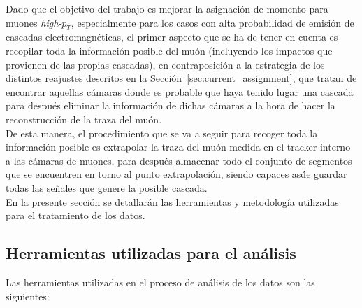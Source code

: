 
Dado que el objetivo del trabajo es mejorar la asignaci\'on de momento para muones \textit{high-$p_{T}$}, especialmente para los casos con alta probabilidad de emisi\'on de cascadas electromagn\'eticas, el primer aspecto que se ha de tener en cuenta es recopilar toda la informaci\'on posible del mu\'on (incluyendo los impactos que provienen de las propias cascadas), en contraposici\'on a la estrategia de los distintos reajustes descritos en la Secci\'on~\ref{sec:current_assignment}, que tratan de encontrar aquellas c\'amaras donde es probable que haya tenido lugar una cascada para despu\'es eliminar la informaci\'on de dichas c\'amaras a la hora de hacer la reconstrucci\'on de la traza del mu\'on. \\
De esta manera, el procedimiento que se va a seguir para recoger toda la informaci\'on posible es extrapolar la traza del mu\'on medida en el tracker interno a las c\'amaras de muones, para despu\'es almacenar todo el conjunto de segmentos que se encuentren en torno al punto extrapolaci\'on, siendo capaces as\' de guardar todas las se\~nales que genere la posible cascada. \\

En la presente secci\'on se detallar\'an las herramientas y metodolog\'ia utilizadas para el tratamiento de los datos.


\subsection{Herramientas utilizadas para el an\'alisis}\label{sec:tools}

Las herramientas utilizadas en el proceso de an\'alisis de los datos son las siguientes:

